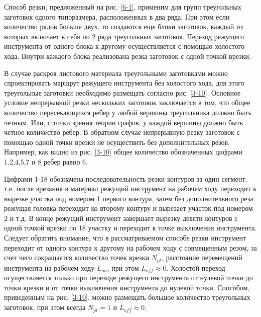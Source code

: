 \documentclass[11pt,twoside]{report}
\begin{document}
Способ резки, предложенный на рис. \ref{6-1},
применим для групп треугольных заготовок одного типоразмера,
расположенных в два ряда.
При этом если количество рядов больше двух,
то создаются еще блоки заготовок,
каждый из которых включает в себя по 2 ряда треугольных заготовок.
Переход режущего инструмента от одного блока к другому
осуществляется с помощью холостого хода.
Внутри каждого блока реализована резка заготовок с одной точкой врезки.

В случае раскроя листового материала треугольными
заготовками можно спроектировать маршрут режущего
инструмента без холостого хода,
для этого треугольные заготовки необходимо
размещать согласно рис. \ref{3-10}.
Основное условие непрерывной резки нескольких
заготовок заключается в том,
что общее количество пересекающихся ребер у
любой вершины треугольника должно быть четным.
Или, с точки зрения теории графов,
у каждой вершины
должно быть четное количество ребер.
В обратном случае непрерывную резку заготовок
с помощью одной точки врезки не осуществить
без дополнительных резов.
Например, как видно из рис. \ref{3-10}
общее количество обозначенных цифрами 1,2,4,5,7 и 8 ребер равно 6.

Цифрами 1-18 обозначена последовательность
резки контуров за один сегмент,
т.е. после врезания в материал режущий инструмент
на рабочем ходу переходит к вырезке участка
под номером 1 первого контура,
затем без дополнительного реза режущая
головка переходит ко второму контуру и
вырезает участок под номером 2 и т.д.
В конце режущий инструмент завершает
вырезку девяти контуров с одной точкой врезки
по 18 участку и переходит к точке выключения инструмента.
Следует обратить внимание, что в рассматриваемом способе
резки инструмент переходит от одного контура к
другому на рабочем ходу с совмещенным резом,
за счет чего сокращается количество точек врезки $N_{pt}$,
расстояние перемещений инструмента на рабочем ходу  $L_{on}$,
при этом
$L_{off} \approx 0$.
Холостой переход осуществляется
только при переходе режущего инструмента
от нулевой точки до точки врезки и от
точки выключения инструмента до нулевой точки.
Способом, приведенным на рис. \ref{3-10},
можно размещать большое количество
треугольных заготовок, при этом всегда $N_{pt}=1$
и $L_{off} \approx 0$.
\end{document}
